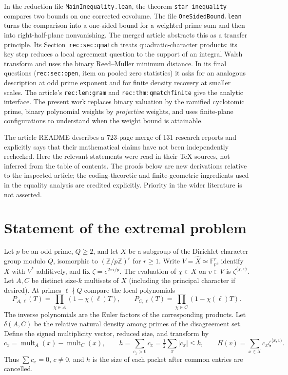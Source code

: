 \documentclass[11pt]{article}
\theoremstyle{remark}\newtheorem{remark}[theorem]{Remark}
\newcommand{\F}{\mathbb F}
\newcommand{\Z}{\mathbb Z}
\begin{document}
In the reduction file \texttt{MainInequality.lean}, the theorem \texttt{star\_inequality} compares two bounds on one corrected covolume. The file \texttt{OneSidedBound.lean} turns the comparison into a one-sided bound for a weighted prime sum and then into right-half-plane nonvanishing. The merged article \cite{article} abstracts this as a transfer principle. Its Section~\texttt{rec:sec:qmatch} treats quadratic-character products: its key step reduces a local agreement question to the support of an integral Walsh transform and uses the binary Reed--Muller minimum distance. In its final questions (\texttt{rec:sec:open}, item on pooled zero statistics) it asks for an analogous description at odd prime exponent and for finite density recovery at smaller scales. The article's \texttt{rec:lem:gram} and \texttt{rec:thm:qmatchfinite} give the analytic interface. The present work replaces binary valuation by the ramified cyclotomic prime, binary polynomial weights by \emph{projective} weights, and uses finite-plane configurations to understand when the weight bound is attainable.

The article README describes a 723-page merge of 131 research reports and explicitly says that their mathematical claims have not been independently rechecked. Here the relevant statements were read in their TeX sources, not inferred from the table of contents. The proofs below are new derivations relative to the inspected article; the coding-theoretic and finite-geometric ingredients used in the equality analysis are credited explicitly. Priority in the wider literature is not asserted.

\section{Statement of the extremal problem}
Let $p$ be an odd prime, $Q\ge2$, and let $X$ be a subgroup of the Dirichlet character group modulo $Q$, isomorphic to $(\Z/p\Z)^r$ for $r\ge1$. Write $V=\widehat X\simeq\F_p^r$, identify $X$ with $V^*$ additively, and fix $\zeta=e^{2\pi i/p}$. The evaluation of $\chi\in X$ on $v\in V$ is $\zeta^{\langle\chi,v\rangle}$. Let $A,C$ be distinct size-$k$ multisets of $X$ (including the principal character if desired). At primes $\ell\nmid Q$ compare the local polynomials
\[
 P_{A,\ell}(T)=\prod_{\chi\in A}(1-\chi(\ell)T),\qquad
 P_{C,\ell}(T)=\prod_{\chi\in C}(1-\chi(\ell)T).
\]
The inverse polynomials are the Euler factors of the corresponding products. Let $\delta(A,C)$ be the relative natural density among primes of the disagreement set. Define the signed multiplicity vector, reduced size, and transform by
\[
 c_x=\operatorname{mult}_A(x)-\operatorname{mult}_C(x),\qquad
 h=\sum_{c_x>0}c_x=\tfrac12\sum_x|c_x|\le k,
 \qquad H(v)=\sum_{x\in X}c_x\zeta^{\langle x,v\rangle}.
\]
Thus $\sum c_x=0$, $c\ne0$, and $h$ is the size of each packet after common entries are cancelled.
\end{document}
